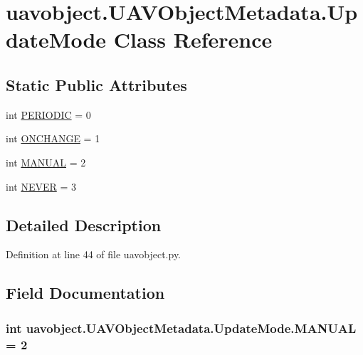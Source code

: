 \hypertarget{classuavobject_1_1_u_a_v_object_metadata_1_1_update_mode}{\section{uavobject.\-U\-A\-V\-Object\-Metadata.\-Update\-Mode Class Reference}
\label{classuavobject_1_1_u_a_v_object_metadata_1_1_update_mode}
}
\subsection*{Static Public Attributes}
\begin{DoxyCompactItemize}
\item 
int \hyperlink{classuavobject_1_1_u_a_v_object_metadata_1_1_update_mode_aa80fb8cda3acfa14969d1a40f1fffbbd}{P\-E\-R\-I\-O\-D\-I\-C} = 0
\item 
int \hyperlink{classuavobject_1_1_u_a_v_object_metadata_1_1_update_mode_aebc5b1f24a0acf6abd518a3a79165d98}{O\-N\-C\-H\-A\-N\-G\-E} = 1
\item 
int \hyperlink{classuavobject_1_1_u_a_v_object_metadata_1_1_update_mode_a5ad275bcd56cf4cee5010aba870e9f2f}{M\-A\-N\-U\-A\-L} = 2
\item 
int \hyperlink{classuavobject_1_1_u_a_v_object_metadata_1_1_update_mode_a80f424691b91d62817388fdc39379a22}{N\-E\-V\-E\-R} = 3
\end{DoxyCompactItemize}


\subsection{Detailed Description}


Definition at line 44 of file uavobject.\-py.



\subsection{Field Documentation}
\hypertarget{classuavobject_1_1_u_a_v_object_metadata_1_1_update_mode_a5ad275bcd56cf4cee5010aba870e9f2f}{
\subsubsection[{M\-A\-N\-U\-A\-L}]{\setlength{\rightskip}{0pt plus 5cm}int uavobject.\-U\-A\-V\-Object\-Metadata.\-Update\-Mode.\-M\-A\-N\-U\-A\-L = 2\hspace{0.3cm}{\ttfamily [static]}}}\label{classuavobject_1_1_u_a_v_object_metadata_1_1_update_mode_a5ad275bcd56cf4cee5010aba870e9f2f}


